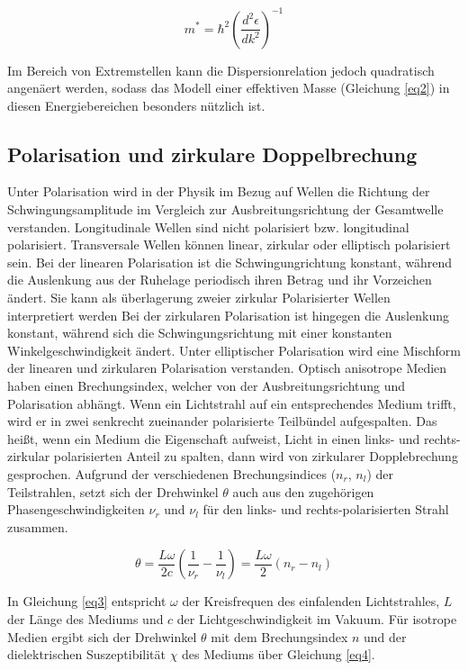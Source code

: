 \begin{equation}
    m^* = \hbar^2 \left( \frac{d^2\epsilon}{dk^2} \right)^{-1}
    \label{eq2}
\end{equation}

Im Bereich von Extremstellen kann die Dispersionrelation jedoch quadratisch angenäert 
werden, sodass das Modell einer effektiven Masse (Gleichung \ref{eq2}) in diesen 
Energiebereichen besonders nützlich ist.

\subsection{Polarisation und zirkulare Doppelbrechung}
Unter Polarisation wird in der Physik im Bezug auf Wellen die Richtung der 
Schwingungsamplitude im Vergleich zur Ausbreitungsrichtung der Gesamtwelle 
verstanden. 
Longitudinale Wellen sind nicht polarisiert bzw. longitudinal polarisiert.
Transversale Wellen können linear, zirkular oder elliptisch polarisiert sein. 
Bei der linearen Polarisation ist die Schwingungrichtung konstant, während die 
Auslenkung aus der Ruhelage periodisch ihren Betrag und ihr Vorzeichen ändert.
Sie kann als überlagerung zweier zirkular Polarisierter Wellen interpretiert werden
Bei der zirkularen Polarisation ist hingegen die Auslenkung konstant, während sich die 
Schwingungsrichtung mit einer konstanten Winkelgeschwindigkeit ändert.
Unter elliptischer Polarisation wird eine Mischform der linearen und zirkularen 
Polarisation verstanden.
Optisch anisotrope Medien haben einen Brechungsindex, welcher von der 
Ausbreitungsrichtung und Polarisation abhängt. 
Wenn ein Lichtstrahl auf ein entsprechendes Medium trifft, wird er in zwei 
senkrecht zueinander polarisierte Teilbündel aufgespalten.
Das heißt, wenn ein Medium die Eigenschaft aufweist, Licht in einen 
links- und rechts-zirkular polarisierten Anteil zu spalten, dann wird von 
zirkularer Dopplebrechung gesprochen.
Aufgrund der verschiedenen Brechungsindices ($n_r$, $n_l$) der Teilstrahlen, setzt sich der 
Drehwinkel $\theta$ auch aus den zugehörigen Phasengeschwindigkeiten $\nu_r$ und $\nu_l$ 
für den links- und rechts-polarisierten Strahl zusammen.

\begin{equation}
    \theta = \frac{L\omega}{2c} \left(\frac{1}{\nu_r} - \frac{1}{\nu_l} \right) = \frac{L\omega}{2} (n_r - n_l )
    \label{eq3}
\end{equation}

In Gleichung \ref{eq3} entspricht $\omega$ der Kreisfrequen des einfalenden Lichtstrahles, 
$L$ der Länge des Mediums und $c$ der Lichtgeschwindigkeit im Vakuum.
Für isotrope Medien ergibt sich der Drehwinkel $\theta$ mit dem Brechungsindex $n$ und 
der dielektrischen Suszeptibilität $\chi$ des Mediums über Gleichung \ref{eq4}.

